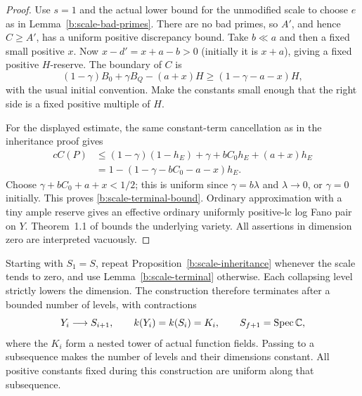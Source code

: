 \begin{proof}
Use $s=1$ and the actual lower bound for the unmodified scale to
choose $e$ as in Lemma~\ref{b:scale-bad-primes}.  There are no bad
primes, so $A'$, and hence $C\ge A'$, has a uniform positive discrepancy
bound.  Take $b\ll a$ and then a fixed small positive $x$.
Now $x-d'=x+a-b>0$ (initially it is $x+a$), giving a fixed positive
$H$-reserve.  The boundary of $C$ is
\[
           (1-\gamma)B_0+\gamma B_Q-(a+x)H
                  \ge(1-\gamma-a-x)H,
\]
with the usual initial convention.  Make the constants small enough
that the right side is a fixed positive multiple of $H$.

For the displayed estimate, the same constant-term cancellation as
in the inheritance proof gives
\[
 \begin{split}
 cC(P)&\le (1-\gamma)(1-h_E)
              +\gamma+bC_0h_E+(a+x)h_E\\
      &=1-(1-\gamma-bC_0-a-x)h_E.
 \end{split}
\]
Choose $\gamma+bC_0+a+x<1/2$; this is uniform since
$\gamma=b\lambda$ and $\lambda\to0$, or $\gamma=0$ initially.
This proves \eqref{b:scale-terminal-bound}.
Ordinary approximation with a tiny ample reserve gives an effective
ordinary uniformly positive-lc log Fano pair on $Y$.
Theorem~1.1 of \cite{BirkarBAB} bounds the underlying variety.
All assertions in dimension zero are interpreted vacuously.
\end{proof}

Starting with $S_1=S$, repeat Proposition~\ref{b:scale-inheritance}
whenever the scale tends to zero, and use
Lemma~\ref{b:scale-terminal} otherwise.  Each collapsing level strictly
lowers the dimension.  The construction therefore terminates after a
bounded number of levels, with contractions
\[
         Y_i\longrightarrow S_{i+1},\qquad
         k(Y_i)=k(S_i)=K_i,\qquad
         S_{f+1}=\operatorname{Spec}\mathbb C,
\]
where the $K_i$ form a nested tower of actual function fields.
Passing to a subsequence makes the number of levels and their dimensions
constant.  All positive constants fixed during this construction are
uniform along that subsequence.
